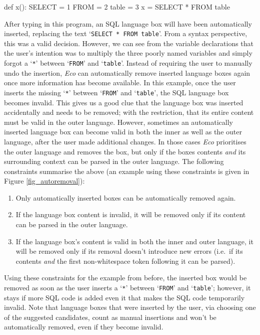 \documentclass[sigplan,screen]{acmart}\settopmatter{printfolios=true,printccs=false,printacmref=false}
\newcommand{\eco}[0]{\emph{Eco}\xspace}
\newcommand{\qtt}[1]{`\texttt{#1}'\xspace}
\begin{document}
\begin{lstdefault}[language=Python]
  def x():
    SELECT = 1
    FROM = 2
    table = 3
    x = SELECT * FROM table
\end{lstdefault}
\vspace{1em}

After typing in this program, an SQL language box will have been automatically
inserted, replacing the text \qtt{SELECT * FROM table}. From a syntax
perspective, this was a valid decision. However, we can see from the variable
declarations that the user's intention was to multiply the three poorly named
variables and simply forgot a \qtt{*} between \qtt{FROM} and \qtt{table}.
Instead of requiring the user to manually undo the insertion, \eco can
automatically remove inserted language boxes again once more information has
become available.  In this example, once the user inserts the missing \qtt{*}
between \qtt{FROM} and \qtt{table}, the SQL language box becomes invalid. This
gives us a good clue that the language box was inserted accidentally and needs
to be removed; with the restriction, that its entire content must be valid in
the outer language.
However, sometimes an automatically inserted language box can become valid in
both the inner as well as the outer language, after the user made additional
changes.  In those cases \eco prioritises the outer language and removes the
box, but only if the boxes contents \emph{and} its surrounding context can be
parsed in the outer language.  The following constraints summarise the above
(an example using these constraints is given in Figure \ref{fig_autoremoval}):
\begin{enumerate}
  \item Only automatically inserted boxes can be automatically removed again.
  \item If the language box content is invalid, it will be removed only if
        its content can be parsed in the outer language.
  \item If the language box's content is valid in both the inner and outer
    language, it will be removed only if its removal doesn't introduce new errors (i.e.~if its contents \emph{and} the first non-whitespace token following it
    can be parsed).
\end{enumerate}

Using these constraints for the example from before, the inserted box would be
removed as soon as the user inserts a \qtt{*} between \qtt{FROM} and
\qtt{table}; however, it stays if more SQL code is added even it that makes the
SQL code temporarily invalid. Note that language boxes that were inserted by the
user, via choosing one of the suggested candidates, count as manual insertions
and won't be automatically removed, even if they become invalid.
\end{document}
